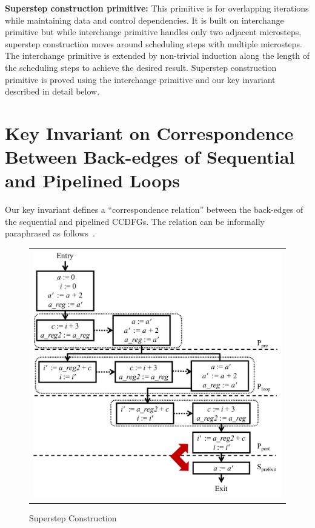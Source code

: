 {\bf Superstep construction primitive:} This primitive is for overlapping iterations while 
maintaining data and control dependencies. It is built on interchange primitive but while interchange primitive
handles only two adjacent microsteps, superstep construction moves around scheduling steps with multiple microsteps. 
The interchange primitive is extended by non-trivial induction along the length of the scheduling steps to achieve the desired result. 
Superstep construction primitive is proved using the 
interchange primitive and our key invariant described in detail below. 

\section{Key Invariant on Correspondence Between Back-edges of Sequential and Pipelined Loops}
 Our key invariant defines a ``correspondence relation''
between the back-edges of the sequential and pipelined CCDFGs.
The relation can be informally paraphrased as
follows~\cite{disha-itp14}.

\begin{figure}[t!]
\begin{center}
\begin{tabular}{c}
\includegraphics[width=5.5in]{fig-proposal/algorithm-after-superstep-construction}
\end{tabular}
\end{center}
\caption{Superstep Construction}
\label{fig:algo3-3}
\end{figure}


